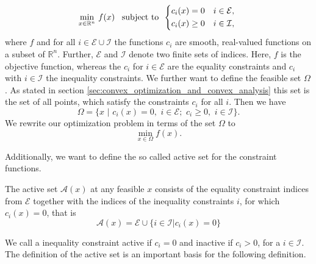             \begin{equation}
                \min_{x \in \mathbb{R}^{n}} \, f(x) \,\,\,\,\, \textnormal{subject to} \,\,\,
                \begin{dcases*}
                    c_{i}(x) = 0 & $i \in \mathcal{E}$, \\
                    c_{i}(x) \ge 0 & $i \in \mathcal{I}$,
                \end{dcases*}
                \label{eq:basic_optimization_problem}
            \end{equation}
        where $f$ and for all $i \in \mathcal{E} \cup \mathcal{I}$ the functions $c_{i}$ are smooth, real-valued functions on a subset of $\mathbb{R}^{n}$. Further, $\mathcal{E}$ and $\mathcal{I}$ denote two finite sets of indices. Here, $f$ is the objective function, whereas the $c_{i}$ for $i \in \mathcal{E}$ are the equality constraints and $c_{i}$ with $i \in \mathcal{I}$ the inequality constraints. We further want to define the feasible set $\Omega$. As stated in section \ref{sec:convex_optimization_and_convex_analysis} this set is the set of all points, which satisfy the constraints $c_{i}$ for all $i$. Then we have
            \begin{equation}
                \Omega = \{ x \,\, | \,\, c_{i}(x) = 0, \,\, i \in \mathcal{E}; \,\, c_{i} \ge 0, \,\, i \in \mathcal{I} \}.
                \label{eq:feasible_set_omega}
            \end{equation}
        We rewrite our optimization problem in terms of the set $\Omega$ to
            $$
                \min_{x \in \Omega} f(x).
            $$

        Additionally, we want to define the so called active set for the constraint functions.

        \begin{definition}
            \label{def:active_set}
            The active set $\mathcal{A}(x)$ at any feasible $x$ consists of the equality constraint indices from $\mathcal{E}$ together with the indices of the inequality constraints $i$, for which $c_{i}(x) = 0$, that is
                \begin{equation}
                    \mathcal{A}(x) = \mathcal{E} \cup \{ i \in \mathcal{I} | c_{i}(x) = 0 \}
                    \label{eq:active_set}
                \end{equation}
        \end{definition}

        We call a inequality constraint active if $c_{i} = 0$ and inactive if $c_{i} > 0$, for a $i \in \mathcal{I}$. The definition of the active set is an important basis for the following definition.

